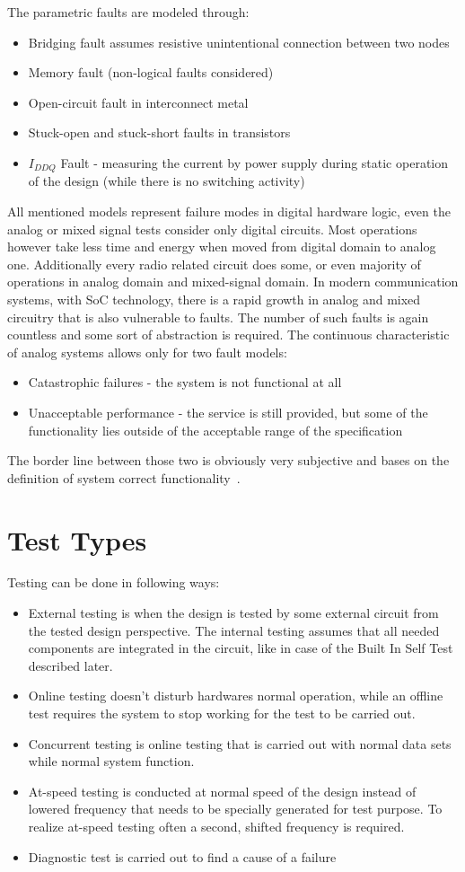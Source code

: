 The parametric faults are modeled through:
\begin{itemize}
    \item Bridging fault assumes resistive unintentional connection between two nodes
    \item Memory fault (non-logical faults considered)
    \item Open-circuit fault in interconnect metal
    \item Stuck-open and stuck-short faults in transistors
    \item $I_{DDQ}$ Fault - measuring the current by power supply during static operation of the design (while there is no switching activity)
\end{itemize}
All mentioned models represent failure modes in digital hardware logic, even the analog or mixed signal tests consider only digital circuits. Most operations however take less time and energy when moved from digital domain to analog one. Additionally every radio related circuit does some, or even majority of operations in analog domain and mixed-signal domain. In modern communication systems, with SoC technology, there is a rapid growth in analog and mixed circuitry that is also vulnerable to faults. The number of such faults is again countless and some sort of abstraction is required. The continuous characteristic of analog systems allows only for two fault models:
\begin{itemize}
    \item Catastrophic failures - the system is not functional at all
    \item Unacceptable performance - the service is still provided, but some of the functionality lies outside of the acceptable range of the specification
\end{itemize}
The border line between those two is obviously very subjective and bases on the definition of system correct functionality~\cite{book:Kabisatpathy}.
\section{Test Types}
Testing can be done in following ways:
\begin{itemize}
    \item External testing is when the design is tested by some external circuit from the tested design perspective. The internal testing assumes that all needed components are integrated in the circuit, like in case of the Built In Self Test described later.
    \item Online testing doesn't disturb hardwares normal operation, while an offline test requires the system to stop working for the test to be carried out.
    \item Concurrent testing is online testing that is carried out with normal data sets while normal system function.
    \item At-speed testing is conducted at normal speed of the design instead of lowered frequency that needs to be specially generated for test purpose. To realize at-speed testing often a second, shifted frequency is required.
    \item Diagnostic test is carried out to find a cause of a failure
\end{itemize}

